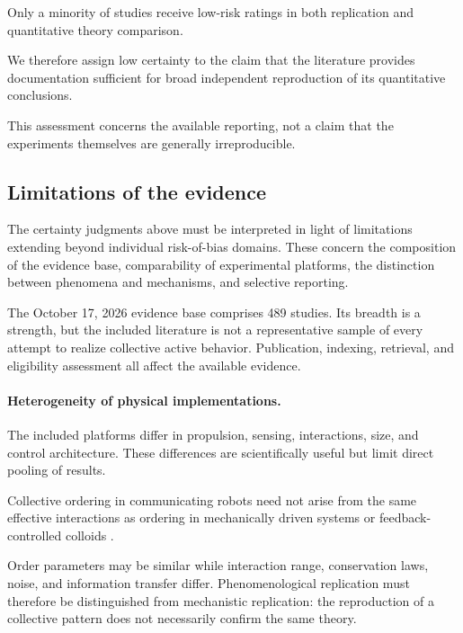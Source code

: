 Only a minority of studies
receive low-risk ratings
in both replication and
quantitative theory comparison.

We therefore assign low certainty
to the claim that the literature
provides documentation sufficient
for broad independent reproduction
of its quantitative conclusions.

This assessment concerns the
available reporting, not a
claim that the experiments
themselves are generally
irreproducible.

\subsection{Limitations of the evidence}
\label{sec:discussion-evidence-limitations}

The certainty judgments above must be interpreted in light
of limitations extending beyond individual risk-of-bias
domains. These concern the composition of the evidence
base, comparability of experimental platforms, the
distinction between phenomena and mechanisms,
and selective reporting.

The October 17, 2026 evidence base comprises
489 studies. Its breadth is a strength, but
the included literature is not a representative
sample of every attempt to realize collective
active behavior. Publication, indexing, retrieval,
and eligibility assessment all affect the
available evidence.

\paragraph*{Heterogeneity of physical implementations.}

The included platforms differ in propulsion,
sensing, interactions, size, and control
architecture. These differences are scientifically
useful but limit direct pooling of results.

Collective ordering in communicating robots
\cite{Turgut2008selforganizedflocka,Vsrhelyi2018optimizedflockingo,Zhou2024anticipationpromote}
need not arise from the same effective interactions
as ordering in mechanically driven systems
\cite{Welch2019activereorientation,Baconnier2022selectiveandcollec,Luo2025flockingphasesepar}
or feedback-controlled colloids
\cite{Buerle2020formationofstable,Chen2024synchronousandfull,Chen2024persistentandrespo}.

Order parameters may be similar while
interaction range, conservation laws,
noise, and information transfer differ.
Phenomenological replication must therefore
be distinguished from mechanistic replication:
the reproduction of a collective pattern
does not necessarily confirm the same theory.

